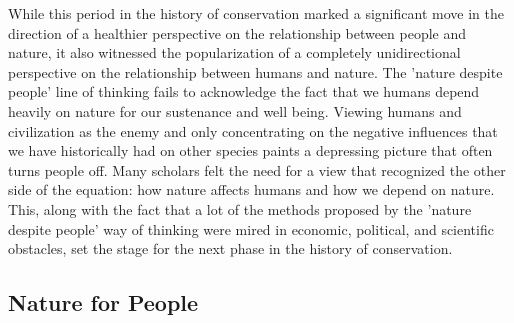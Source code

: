 \documentclass[rutwik_proposal.tex]{subfiles}
\begin{document}
While this period in the history of conservation marked a significant move in the direction of a healthier perspective on the relationship between people and nature, it also witnessed the popularization of a completely unidirectional perspective on the relationship between humans and nature. The 'nature despite people' line of thinking fails to acknowledge the fact that we humans depend heavily on nature for our sustenance and well being. Viewing humans and civilization as the enemy and only concentrating on the negative influences that we have historically had on other species paints a depressing picture that often turns people off. Many scholars felt the need for a view that recognized the other side of the equation: how nature affects humans and how we depend on nature. This, along with the fact that a lot of the methods proposed by the 'nature despite people' way of thinking were mired in economic, political, and scientific obstacles, set the stage for the next phase in the history of conservation.

\subsection{Nature for People}\label{subsec:ecoservices}
\end{document}
